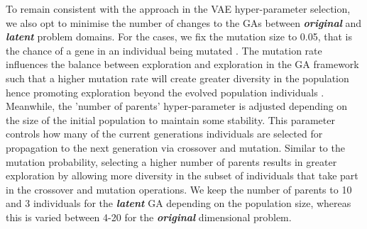 \documentclass{article}
\begin{document}
\begin{table}[h]
\centering
{}
\caption{Genetic Algorithm Tested Optimisation Tasks for Original Resolution Shape Representations}
\label{tab:GA_models_original}
\end{table}

To remain consistent with the approach in the VAE hyper-parameter selection, we also opt to minimise the number of changes to the GAs between \textbf{\textit{original}} and \textbf{\textit{latent}} problem domains. For the cases, we fix the mutation size to 0.05, that is the chance of a gene in an individual being mutated \citep{Hassanat2019}. The mutation rate influences the balance between exploration and exploration in the GA framework such that a higher mutation rate will create greater diversity in the population hence promoting exploration beyond the evolved population individuals \citep{Hussain2020}. Meanwhile, the 'number of parents' hyper-parameter is adjusted depending on the size of the initial population to maintain some stability. This parameter controls how many of the current generations individuals are selected for propagation to the next generation via crossover and mutation. Similar to the mutation probability, selecting a higher number of parents results in greater exploration by allowing more diversity in the subset of individuals that take part in the crossover and mutation operations. We keep the number of parents to 10 and 3 individuals for the \textbf{\textit{latent}} GA depending on the population size, whereas this is varied between 4-20 for the \textbf{\textit{original}} dimensional problem.
\end{document}
